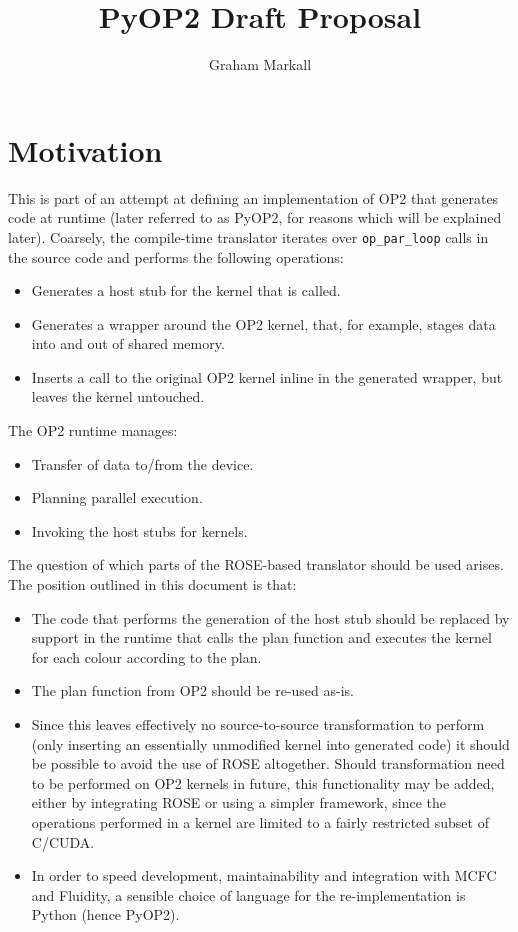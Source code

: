 \documentclass[a4paper]{article}
\author{Graham Markall}
\title{PyOP2 Draft Proposal}
\begin{document}
\maketitle

\section{Motivation}

This is part of an attempt at defining an implementation of OP2 that generates code at runtime (later referred to as PyOP2, for reasons which will be explained later). Coarsely, the compile-time translator iterates over \verb|op_par_loop| calls in the source code and performs the following operations:

\begin{itemize}
\item Generates a host stub for the kernel that is called.
\item Generates a wrapper around the OP2 kernel, that, for example, stages data into and out of shared memory.
\item Inserts a call to the original OP2 kernel inline in the generated wrapper, but leaves the kernel untouched.
\end{itemize}

\noindent The OP2 runtime manages:

\begin{itemize}
\item Transfer of data to/from the device.
\item Planning parallel execution.
\item Invoking the host stubs for kernels.
\end{itemize}

The question of which parts of the ROSE-based translator should be used arises. The position outlined in this document is that:

\begin{itemize}
\item The code that performs the generation of the host stub should be replaced by support in the runtime that calls the plan function and executes the kernel for each colour according to the plan.
\item The plan function from OP2 should be re-used as-is.
\item Since this leaves effectively no source-to-source transformation to perform (only inserting an essentially unmodified kernel into generated code) it should be possible to avoid the use of ROSE altogether. Should transformation need to be performed on OP2 kernels in future, this functionality may be added, either by integrating ROSE or using a simpler framework, since the operations performed in a kernel are limited to a fairly restricted subset of C/CUDA.
\item In order to speed development, maintainability and integration with MCFC and Fluidity, a sensible choice of language for the re-implementation is Python (hence PyOP2).
\end{itemize}
\end{document}
